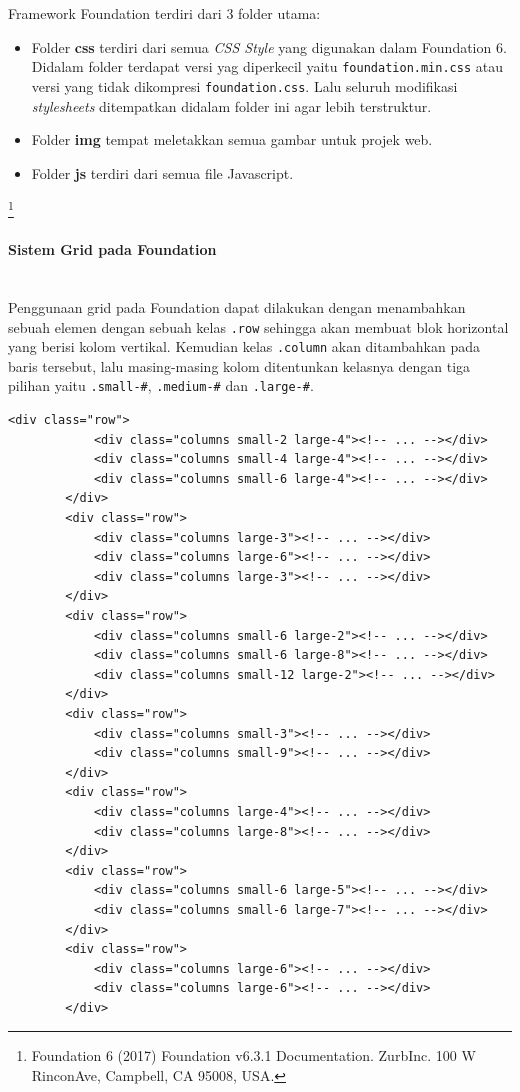 \documentclass[a4paper,twoside]{article}
\newcommand{\myparagraph}[1]{\paragraph{#1}\mbox{}\\}
\begin{document}
\begin{enumerate}
		Framework Foundation terdiri dari 3 folder utama:
		\begin{itemize}
			\item Folder \textbf{css} terdiri dari semua \textit{CSS Style} yang digunakan dalam Foundation 6. Didalam folder terdapat versi yag diperkecil yaitu \verb|foundation.min.css| atau versi yang tidak dikompresi \verb|foundation.css|. Lalu seluruh modifikasi \textit{stylesheets} ditempatkan didalam folder ini agar lebih terstruktur.
			\item Folder \textbf{img} tempat meletakkan semua gambar untuk projek web.
			\item Folder \textbf{js} terdiri dari semua file Javascript.
		\end{itemize} \footnote{Foundation 6 (2017) Foundation v6.3.1 Documentation. ZurbInc. 100 W RinconAve, Campbell, CA 95008, USA. }
		
		\myparagraph{Sistem Grid pada Foundation}
		Penggunaan grid pada Foundation dapat dilakukan dengan menambahkan sebuah elemen dengan sebuah kelas \texttt{.row} sehingga akan membuat blok horizontal yang berisi kolom vertikal. Kemudian kelas \texttt{.column} akan ditambahkan pada baris tersebut, lalu masing-masing kolom ditentunkan kelasnya dengan tiga pilihan yaitu 
		\colorbox{mygray}{\texttt{.small-\#}}, \colorbox{mygray}{\texttt{.medium-\#}} dan \colorbox{mygray}{\texttt{.large-\#}}.
		
		\begin{lstlisting}[frame=single] 
		<div class="row">
			<div class="columns small-2 large-4"><!-- ... --></div>
			<div class="columns small-4 large-4"><!-- ... --></div>
			<div class="columns small-6 large-4"><!-- ... --></div>
		</div>
		<div class="row">
			<div class="columns large-3"><!-- ... --></div>
			<div class="columns large-6"><!-- ... --></div>
			<div class="columns large-3"><!-- ... --></div>
		</div>
		<div class="row">
			<div class="columns small-6 large-2"><!-- ... --></div>
			<div class="columns small-6 large-8"><!-- ... --></div>
			<div class="columns small-12 large-2"><!-- ... --></div>
		</div>
		<div class="row">
			<div class="columns small-3"><!-- ... --></div>
			<div class="columns small-9"><!-- ... --></div>
		</div>
		<div class="row">
			<div class="columns large-4"><!-- ... --></div>
			<div class="columns large-8"><!-- ... --></div>
		</div>
		<div class="row">
			<div class="columns small-6 large-5"><!-- ... --></div>
			<div class="columns small-6 large-7"><!-- ... --></div>
		</div>
		<div class="row">
			<div class="columns large-6"><!-- ... --></div>
			<div class="columns large-6"><!-- ... --></div>
		</div>
		\end{lstlisting}
		

\end{enumerate}
\end{document}
